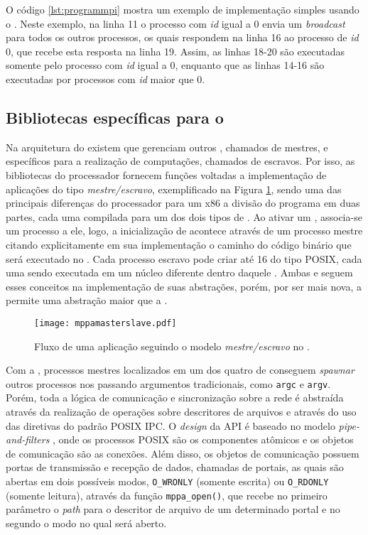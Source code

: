 O código \ref{lst:programmpi} mostra um exemplo de implementação simples usando o \MPI. Neste exemplo, na linha 11 o processo com \textit{id} igual a 0 envia um \textit{broadcast} para todos os outros processos, os quais respondem na linha 16 ao processo de \textit{id} 0, que recebe esta resposta na linha 19. Assim, as linhas 18-20 são executadas somente pelo processo com \textit{id} igual a 0, enquanto que as linhas 14-16 são executadas por processos com \textit{id} maior que 0. 

\subsection{Bibliotecas específicas para o \mppa}
\label{sec:bibliotecasespecificasmppa}

Na arquitetura do \mppa existem \clusters que gerenciam outros \clusters, chamados de mestres, e \clusters específicos para a realização de computações, chamados de escravos. Por isso, as bibliotecas do processador fornecem funções voltadas a implementação de aplicações do tipo \textit{mestre/escravo}, exemplificado na Figura \ref{fig:masterslave}, sendo uma das principais diferenças do processador para um x86 a divisão do programa em duas partes, cada uma compilada para um dos dois tipos de \clusters. Ao ativar um \cluster, associa-se um processo a ele, logo, a inicialização de \CCs acontece através de um processo mestre citando explicitamente em sua implementação o caminho do código binário que será executado no \CC. Cada processo escravo pode criar até 16 \threads do tipo POSIX, cada uma sendo executada em um núcleo diferente dentro daquele \cluster. Ambas \ASYNC e \IPC seguem esses conceitos na implementação de suas abstrações, porém, por ser mais nova, a \ASYNC permite uma abstração maior que a \IPC. 

\begin{figure}[tb]
  \centering
  \caption{Fluxo de uma aplicação seguindo o modelo \textit{mestre/escravo} no \mppa.}
  \label{fig:masterslave}
  \texttt{[image: mppamasterslave.pdf]}
\end{figure}

Com a \IPC, processos mestres localizados em um dos quatro \clusters de \IO conseguem \textit{spawnar} outros processos nos \CCs passando argumentos tradicionais, como \texttt{argc} e \texttt{argv}. Porém, toda a lógica de comunicação e sincronização sobre a rede \NoC é abstraída através da realização de operações sobre descritores de arquivos e através do uso das diretivas do padrão POSIX IPC. O \textit{design} da API é baseado no modelo \textit{pipe-and-filters} \cite{softwarecomponentmodels}, onde os processos POSIX são os componentes atômicos e os objetos de comunicação são as conexões. Além disso, os objetos de comunicação possuem portas de transmissão e recepção de dados, chamadas de portais, as quais são abertas em dois possíveis modos, \texttt{O\_WRONLY} (somente escrita) ou \texttt{O\_RDONLY} (somente leitura), através da função \texttt{mppa\_open()}, que recebe no primeiro parâmetro o \textit{path} para o descritor de arquivo de um determinado portal e no segundo o modo no qual será aberto.

